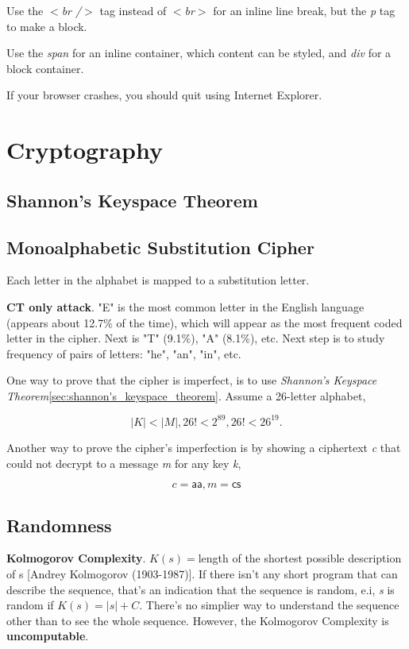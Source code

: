\documentclass[12pt]{article}
\begin{document}
Use the \emph{$<$br /$>$} tag instead of \emph{$<$br$>$} for an inline line break, but the \emph{p} tag to make a block.

Use the \emph{span} for an inline container, which content can be styled, and \emph{div} for a block container.

If your browser crashes, you should quit using Internet Explorer.

\section*{Cryptography}

\subsection*{Shannon's Keyspace Theorem}
\label{sec:shannon's_keyspace_theorem}

\subsection*{Monoalphabetic Substitution Cipher}

Each letter in the alphabet is mapped to a substitution letter.

\textbf{CT only attack}. "E" is the most common letter in the English language (appears about 12.7\% of the time), which will appear as the most frequent coded letter in the cipher. Next is "T" (9.1\%), "A" (8.1\%), etc. Next step is to study frequency of pairs of letters: "he", "an", "in", etc.

One way to prove that the cipher is imperfect, is to use \emph{Shannon's Keyspace Theorem}\ref{sec:shannon's_keyspace_theorem}. Assume a 26-letter alphabet,

\begin{equation}
|K| < |M|, 26! < 2^{89}, 26! < 26^{19}.
\end{equation}

Another way to prove the cipher's imperfection is by showing a ciphertext \emph{c} that could not decrypt to a message \emph{m} for any key \emph{k},

\begin{equation}
c = \mathsf{aa}, m = \mathsf{cs}
\end{equation}

\subsection*{Randomness}
\textbf{Kolmogorov Complexity}.
$K(s) = $length of the shortest possible description of s [Andrey Kolmogorov (1903-1987)]. If there isn't any short program that can describe the sequence, that's an indication that the sequence is random, e.i, \emph{s} is random if $K(s) = |s| + C$. There's no simplier way to understand the sequence other than to see the whole sequence. However, the Kolmogorov Complexity is \textbf{uncomputable}.
\end{document}
